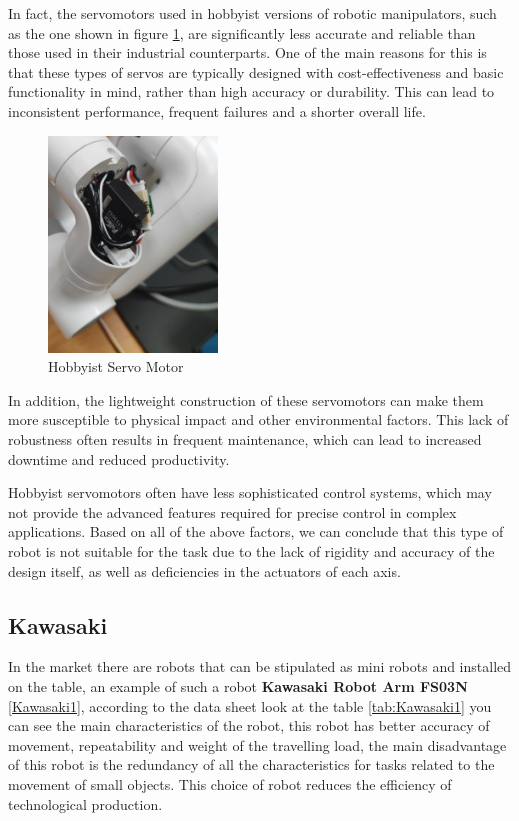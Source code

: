 In fact, the servomotors used in hobbyist versions of robotic manipulators, such as the one shown in figure \ref*{mycobot3}, are significantly less accurate and reliable than those used in their industrial counterparts. One of the main reasons for this is that these types of servos are typically designed with cost-effectiveness and basic functionality in mind, rather than high accuracy or durability. This can lead to inconsistent performance, frequent failures and a shorter overall life.


\begin{figure}[H]
	\centering
	\includegraphics[width=0.4\textwidth]{Src/images/mycobot3.png}
	\caption{Hobbyist Servo Motor}
    \label{mycobot3}
\end{figure}


In addition, the lightweight construction of these servomotors can make them more susceptible to physical impact and other environmental factors. This lack of robustness often results in frequent maintenance, which can lead to increased downtime and reduced productivity.

Hobbyist servomotors often have less sophisticated control systems, which may not provide the advanced features required for precise control in complex applications. 
Based on all of the above factors, we can conclude that this type of robot is not suitable for the task due to the lack of rigidity and accuracy of the design itself, as well as deficiencies in the actuators of each axis.

\subsection*{Kawasaki}

In the market there are robots that can be stipulated as mini robots and installed on the table, an example of such a robot \textbf{Kawasaki Robot Arm FS03N} \ref*{Kawasaki1}, according to the data sheet look at the table \ref*{tab:Kawasaki1} you can see the main characteristics of the robot, this robot has better accuracy of movement, repeatability and weight of the travelling load, the main disadvantage of this robot is the redundancy of all the characteristics for tasks related to the movement of small objects. This choice of robot reduces the efficiency of technological production.


